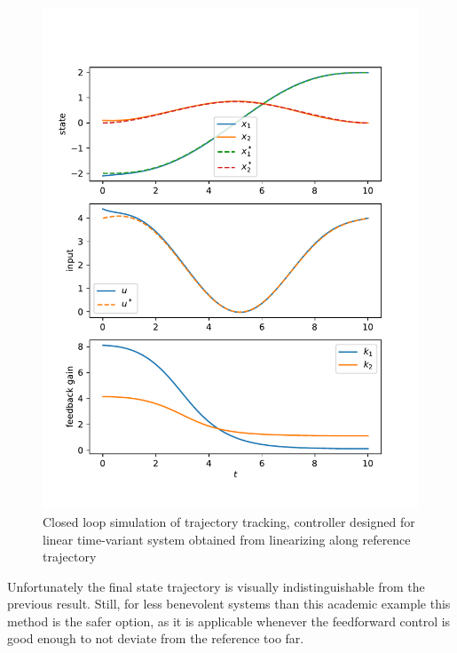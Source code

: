 \documentclass[a4paper,11pt,headinclude=true,headsepline,parskip=half,DIV=13]{scrartcl}
\begin{document}
\begin{figure}[ht]
    \centering
    \includegraphics[scale=1]{img/ludyk_ltv.pdf}
    \caption{Closed loop simulation of trajectory tracking, controller designed for linear time-variant system obtained from linearizing along reference trajectory}
    \label{fig:ludyk_ltv}
\end{figure}

Unfortunately the final state trajectory is visually indistinguishable from the previous result.
Still, for less benevolent systems than this academic example this method is the safer option, as it is applicable whenever the feedforward control is good enough to not deviate from the reference too far.

\printglossaries
\end{document}
